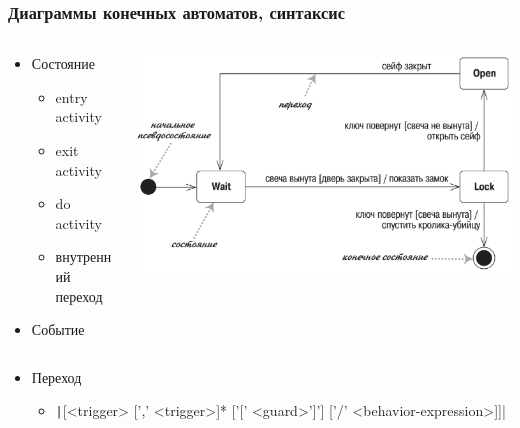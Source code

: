 \documentclass{../mcsslides}
\begin{document}
    \begin{frame}
        \frametitle{Диаграммы конечных автоматов, синтаксис}
        \begin{columns}
            \begin{column}{0.5\textwidth}
                \begin{itemize}
                    \item Состояние
                    \begin{itemize}
                        \item entry activity
                        \item exit activity
                        \item do activity
                        \item внутренний переход
                    \end{itemize}
                    \item Событие
                \end{itemize}
            \end{column}
            \begin{column}{0.5\textwidth}
                \begin{center}
                    \includegraphics[width=\textwidth]{stateTransitionSyntax.png}
                \end{center}
            \end{column}
        \end{columns}
        \begin{itemize}
            \item Переход
            \begin{itemize}
                \item \texttt|[<trigger> [',' <trigger>]* ['[' <guard>']'] ['/' <behavior-expression>]]|
            \end{itemize}
        \end{itemize}
    \end{frame}
\end{document}
